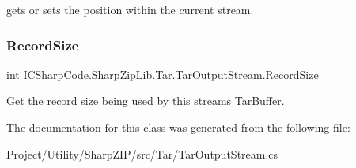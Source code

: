 gets or sets the position within the current stream. 

\mbox{\label{class_i_c_sharp_code_1_1_sharp_zip_lib_1_1_tar_1_1_tar_output_stream_af34a2b2ebc3683585a981e8224e06ec8}} 
\subsubsection{\texorpdfstring{Record\+Size}{RecordSize}}
{\footnotesize\ttfamily int I\+C\+Sharp\+Code.\+Sharp\+Zip\+Lib.\+Tar.\+Tar\+Output\+Stream.\+Record\+Size\hspace{0.3cm}{\ttfamily [get]}}



Get the record size being used by this stream\textquotesingle{}s \hyperlink{class_i_c_sharp_code_1_1_sharp_zip_lib_1_1_tar_1_1_tar_buffer}{Tar\+Buffer}. 



The documentation for this class was generated from the following file\+:\begin{DoxyCompactItemize}
\item 
Project/\+Utility/\+Sharp\+Z\+I\+P/src/\+Tar/Tar\+Output\+Stream.\+cs\end{DoxyCompactItemize}

